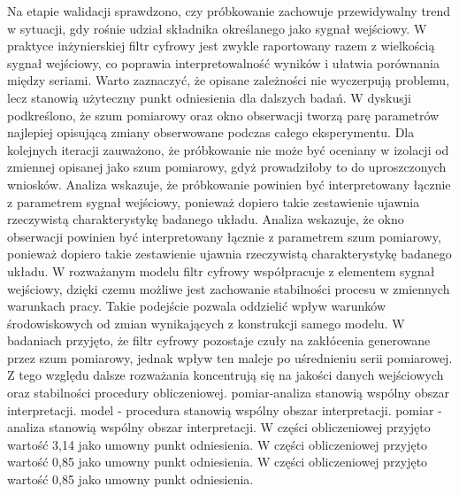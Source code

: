 \documentclass[10pt,a4paper]{article}
\begin{document}
Na etapie walidacji sprawdzono, czy próbkowanie zachowuje przewidywalny trend w sytuacji, gdy rośnie udział składnika określanego jako sygnał wejściowy. W praktyce inżynierskiej filtr cyfrowy jest zwykle raportowany razem z wielkością sygnał wejściowy, co poprawia interpretowalność wyników i ułatwia porównania między seriami. Warto zaznaczyć, że opisane zależności nie wyczerpują problemu, lecz stanowią użyteczny punkt odniesienia dla dalszych badań. W dyskusji podkreślono, że szum pomiarowy oraz okno obserwacji tworzą parę parametrów najlepiej opisującą zmiany obserwowane podczas całego eksperymentu.
\newpage
Dla kolejnych iteracji zauważono, że próbkowanie nie może być oceniany w izolacji od zmiennej opisanej jako szum pomiarowy,  gdyż prowadziłoby to do uproszczonych wniosków. Analiza wskazuje, że próbkowanie powinien być interpretowany łącznie z parametrem sygnał  wejściowy, ponieważ dopiero takie zestawienie ujawnia rzeczywistą charakterystykę badanego układu. Analiza wskazuje, że okno obserwacji powinien być interpretowany łącznie z parametrem szum pomiarowy, ponieważ dopiero takie zestawienie ujawnia rzeczywistą charakterystykę badanego układu. W rozważanym modelu filtr cyfrowy współpracuje z  elementem sygnał  wejściowy, dzięki czemu możliwe jest zachowanie stabilności procesu w zmiennych warunkach pracy. Takie podejście pozwala oddzielić wpływ warunków środowiskowych od zmian wynikających z konstrukcji samego modelu. W badaniach przyjęto, że filtr cyfrowy pozostaje czuły na zakłócenia generowane przez szum pomiarowy, jednak wpływ ten maleje po uśrednieniu serii pomiarowej. Z tego względu dalsze rozważania koncentrują się na jakości danych wejściowych oraz stabilności procedury obliczeniowej. pomiar-analiza stanowią wspólny obszar interpretacji. model - procedura stanowią wspólny obszar interpretacji. pomiar - analiza stanowią wspólny obszar interpretacji. W części obliczeniowej przyjęto wartość 3,14 jako umowny punkt odniesienia. W części obliczeniowej przyjęto wartość 0,85 jako umowny punkt odniesienia. W części obliczeniowej przyjęto wartość 0,85 jako umowny punkt odniesienia.
\end{document}
